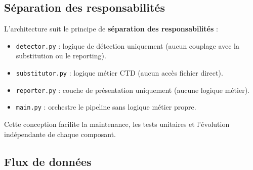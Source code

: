 \documentclass[12pt,a4paper]{article}
\begin{document}
\subsection{Séparation des responsabilités}

L'architecture suit le principe de \textbf{séparation des responsabilités} :

\begin{itemize}
  \item \texttt{detector.py} : logique de détection uniquement (aucun couplage avec
    la substitution ou le reporting).
  \item \texttt{substitutor.py} : logique métier CTD (aucun accès fichier direct).
  \item \texttt{reporter.py} : couche de présentation uniquement (aucune logique métier).
  \item \texttt{main.py} : orchestre le pipeline sans logique métier propre.
\end{itemize}

Cette conception facilite la maintenance, les tests unitaires et l'évolution indépendante
de chaque composant.

\subsection{Flux de données}
\end{document}
